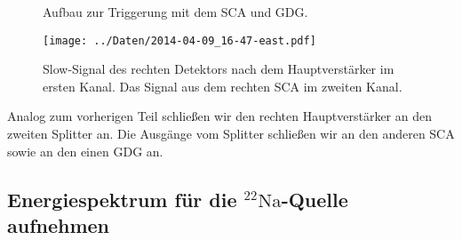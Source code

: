 \begin{figure}[htbp]
    \centering
    \caption{%
        Aufbau zur Triggerung mit dem SCA und GDG.
    }
    \label{fig:aufbau:sca_gdg}
\end{figure}

\begin{figure}[htbp]
    \centering
    \texttt{[image: ../Daten/2014-04-09\_16-47-east.pdf]}
    \caption{%
        Slow-Signal des rechten Detektors nach dem Hauptverstärker im ersten
        Kanal. Das Signal aus dem rechten SCA im zweiten Kanal.
    }
    \label{fig:sca_umschlossen}
\end{figure}

Analog zum vorherigen Teil schließen wir den rechten Hauptverstärker an den
zweiten Splitter an. Die Ausgänge vom Splitter schließen wir an den anderen SCA
sowie an den einen GDG an.

\subsection{Energiespektrum für die ${}^{22}\text{Na}$-Quelle aufnehmen}

